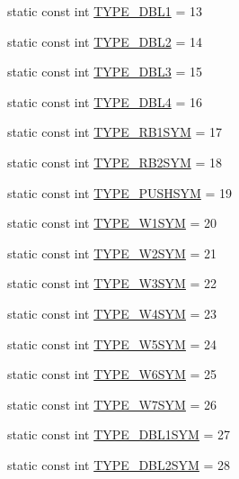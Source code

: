 \begin{DoxyCompactItemize}
static const int \hyperlink{classbst__ns_1_1SCXRecord_af5e2449e308553f3140c58def43ab54d}{T\+Y\+P\+E\+\_\+\+D\+B\+L1} = 13
\item 
static const int \hyperlink{classbst__ns_1_1SCXRecord_af6dbccddc5b03de4b10e183a38413e64}{T\+Y\+P\+E\+\_\+\+D\+B\+L2} = 14
\item 
static const int \hyperlink{classbst__ns_1_1SCXRecord_aa4a75da85c7799d8cb287d08811209e9}{T\+Y\+P\+E\+\_\+\+D\+B\+L3} = 15
\item 
static const int \hyperlink{classbst__ns_1_1SCXRecord_a2115276d4de941cd0dcf0222ea65e5cb}{T\+Y\+P\+E\+\_\+\+D\+B\+L4} = 16
\item 
static const int \hyperlink{classbst__ns_1_1SCXRecord_a89eeec55147c741763245f2b5c695770}{T\+Y\+P\+E\+\_\+\+R\+B1\+S\+YM} = 17
\item 
static const int \hyperlink{classbst__ns_1_1SCXRecord_af48a81834a9a03a2dfc5156dee2ee950}{T\+Y\+P\+E\+\_\+\+R\+B2\+S\+YM} = 18
\item 
static const int \hyperlink{classbst__ns_1_1SCXRecord_a18340cd31d82e3ec79fb292011e5bdbe}{T\+Y\+P\+E\+\_\+\+P\+U\+S\+H\+S\+YM} = 19
\item 
static const int \hyperlink{classbst__ns_1_1SCXRecord_af40b97d91dcb961dde9013019da49538}{T\+Y\+P\+E\+\_\+\+W1\+S\+YM} = 20
\item 
static const int \hyperlink{classbst__ns_1_1SCXRecord_ab690bec0dc75b97fa6a1d260d86b2ab9}{T\+Y\+P\+E\+\_\+\+W2\+S\+YM} = 21
\item 
static const int \hyperlink{classbst__ns_1_1SCXRecord_a917e0d386b53b9eaff39d33bd2a37f4b}{T\+Y\+P\+E\+\_\+\+W3\+S\+YM} = 22
\item 
static const int \hyperlink{classbst__ns_1_1SCXRecord_a48f56e548914970234daf233bb953e5a}{T\+Y\+P\+E\+\_\+\+W4\+S\+YM} = 23
\item 
static const int \hyperlink{classbst__ns_1_1SCXRecord_aa4f915da3d1bdcf1b63e11be59031ac7}{T\+Y\+P\+E\+\_\+\+W5\+S\+YM} = 24
\item 
static const int \hyperlink{classbst__ns_1_1SCXRecord_a4e010c66b666b160b2fb177cb9573a90}{T\+Y\+P\+E\+\_\+\+W6\+S\+YM} = 25
\item 
static const int \hyperlink{classbst__ns_1_1SCXRecord_ad1a27e48ecafa960328de582204dce0e}{T\+Y\+P\+E\+\_\+\+W7\+S\+YM} = 26
\item 
static const int \hyperlink{classbst__ns_1_1SCXRecord_a4f900214380d262fa03d1092e2ea4b8a}{T\+Y\+P\+E\+\_\+\+D\+B\+L1\+S\+YM} = 27
\item 
static const int \hyperlink{classbst__ns_1_1SCXRecord_a17f2e28caa171d59bb58af0b3b92e2e9}{T\+Y\+P\+E\+\_\+\+D\+B\+L2\+S\+YM} = 28

\end{DoxyCompactItemize}
